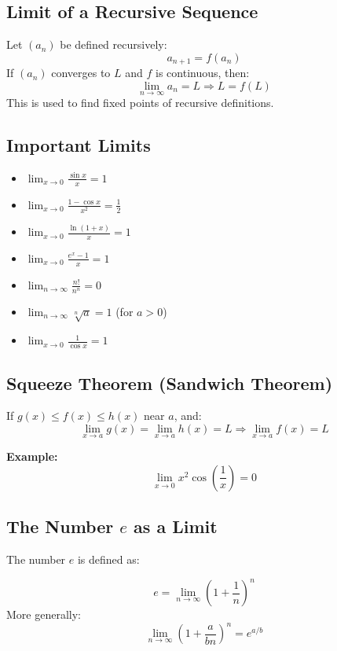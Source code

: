 \subsection{Limit of a Recursive Sequence}

Let \((a_n)\) be defined recursively:
\[
a_{n+1} = f(a_n)
\]
If \((a_n)\) converges to \(L\) and \(f\) is continuous, then:
\[
\lim_{n \to \infty} a_n = L \Rightarrow L = f(L)
\]
This is used to find fixed points of recursive definitions.

\subsection{Important Limits}

\begin{itemize}[label=\(-\)]
\item \(\displaystyle \lim_{x \to 0} \frac{\sin x}{x} = 1\)
\item \(\displaystyle \lim_{x \to 0} \frac{1 - \cos x}{x^2} = \frac{1}{2}\)
\item \(\displaystyle \lim_{x \to 0} \frac{\ln(1 + x)}{x} = 1\)
\item \(\displaystyle \lim_{x \to 0} \frac{e^x - 1}{x} = 1\)
\item \(\displaystyle \lim_{n \to \infty} \frac{n!}{n^n} = 0\)
\item \(\displaystyle \lim_{n \to \infty} \sqrt[n]{a} = 1\) (for \(a > 0\))
\item \(\displaystyle \lim_{x \to 0} \frac{1}{\cos x} = 1\)
\end{itemize}

\subsection{Squeeze Theorem (Sandwich Theorem)}

If \(g(x) \le f(x) \le h(x)\) near \(a\), and:
\[
\lim_{x \to a} g(x) = \lim_{x \to a} h(x) = L
\Rightarrow \lim_{x \to a} f(x) = L
\]

\textbf{Example:}
\[
\lim_{x \to 0} x^2 \cos\left( \frac{1}{x} \right) = 0
\]

\subsection{The Number \texorpdfstring{\(e\)}{e} as a Limit}

The number \(e\) is defined as:

\[
e = \lim_{n \to \infty} {\left(1 + \frac{1}{n} \right)}^n
\]
More generally:
\[
\lim_{n \to \infty} {\left(1 + \frac{a}{bn} \right)}^n = e^{a/b}
\]


